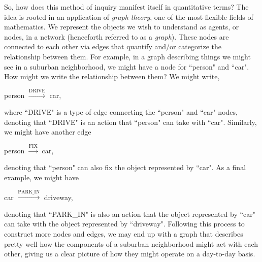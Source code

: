 \documentclass[12pt]{article}
\theoremstyle{definition}
\begin{document}
So, how does this method of inquiry manifest itself in quantitative terms? The idea is rooted in an application of \textit{graph theory}, one of the most flexible fields of mathematics. We represent the objects we wish to understand as agents, or nodes, in a network (henceforth referred to as a \textit{graph}). These nodes are connected to each other via edges that quantify and/or categorize the relationship between them. For example, in a graph describing things we might see in a suburban neighborhood, we might have a node for ``person" and ``car". How might we write the relationship between them? We might write,

\begin{center}
    person $\xrightarrow{\text{DRIVE}}$ car,
\end{center}

where ``DRIVE" is a type of edge connecting the ``person" and ``car" nodes, denoting that ``DRIVE" is an action that ``person" can take with ``car". Similarly, we might have another edge

\begin{center}
    person $\xrightarrow{\text{FIX}}$ car,
\end{center}

denoting that ``person" can also fix the object represented by ``car". As a final example, we might have

\begin{center}
    car $\xrightarrow{\text{PARK\_IN}}$ driveway,
\end{center}

denoting that ``PARK\_IN" is also an action that the object represented by ``car" can take with the object represented by ``driveway". Following this process to construct more nodes and edges, we may end up with a graph that describes pretty well how the components of a suburban neighborhood might act with each other, giving us a clear picture of how they might operate on a day-to-day basis.
\end{document}
